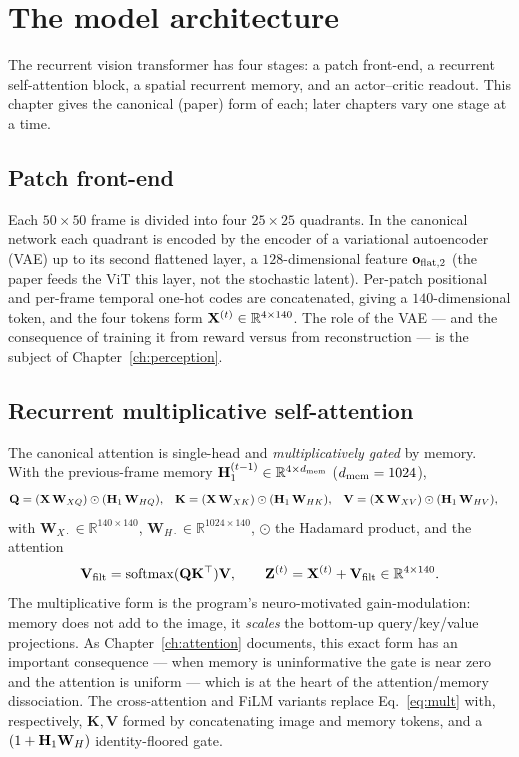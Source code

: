\chapter{The model architecture}
\label{ch:model}

The recurrent vision transformer has four stages: a patch front-end, a recurrent
self-attention block, a spatial recurrent memory, and an actor--critic readout. This
chapter gives the canonical (paper) form of each; later chapters vary one stage at a time.

\section{Patch front-end}
Each $50\times50$ frame is divided into four $25\times25$ quadrants. In the canonical
network each quadrant is encoded by the encoder of a variational autoencoder (VAE) up to
its second flattened layer, a $128$-dimensional feature $\mathbf{o}_{\text{flat,2}}$ (the paper feeds the ViT
this layer, not the stochastic latent). Per-patch positional and per-frame temporal
one-hot codes are concatenated, giving a $140$-dimensional token, and the four tokens form
$\mathbf{X}^{(t)}\in\mathbb R^{4\times140}$. The role of the VAE --- and the consequence of
training it from reward versus from reconstruction --- is the subject of
Chapter~\ref{ch:perception}.

\section{Recurrent multiplicative self-attention}
The canonical attention is single-head and \emph{multiplicatively gated} by memory. With
the previous-frame memory $\mathbf{H}_1^{(t-1)}\in\mathbb R^{4\times d_{\text{mem}}}$ ($d_{\text{mem}}=1024$),
\begin{align}
\mathbf Q &= (\mathbf{X}\,\mathbf W_{XQ})\odot(\mathbf{H}_1\,\mathbf W_{HQ}), &
\mathbf K &= (\mathbf{X}\,\mathbf W_{XK})\odot(\mathbf{H}_1\,\mathbf W_{HK}), &
\mathbf V &= (\mathbf{X}\,\mathbf W_{XV})\odot(\mathbf{H}_1\,\mathbf W_{HV}),
\label{eq:mult}
\end{align}
with $\mathbf W_{X\cdot}\in\mathbb R^{140\times140}$, $\mathbf W_{H\cdot}\in\mathbb
R^{1024\times140}$, $\odot$ the Hadamard product, and the attention
\begin{equation}
\mathbf V_{\text{filt}}=\mathrm{softmax}(\mathbf Q\mathbf K^\top)\mathbf V,\qquad
\mathbf Z^{(t)}=\mathbf{X}^{(t)}+\mathbf V_{\text{filt}}\in\mathbb R^{4\times140}.
\label{eq:z}
\end{equation}
The multiplicative form is the program's neuro-motivated gain-modulation: memory does not
add to the image, it \emph{scales} the bottom-up query/key/value projections. As
Chapter~\ref{ch:attention} documents, this exact form has an important consequence ---
when memory is uninformative the gate is near zero and the attention is uniform --- which
is at the heart of the attention/memory dissociation. The cross-attention and FiLM
variants replace Eq.~\eqref{eq:mult} with, respectively, $\mathbf K,\mathbf V$ formed by
concatenating image and memory tokens, and a $(1+\mathbf{H}_1\mathbf W_{H})$ identity-floored
gate.

